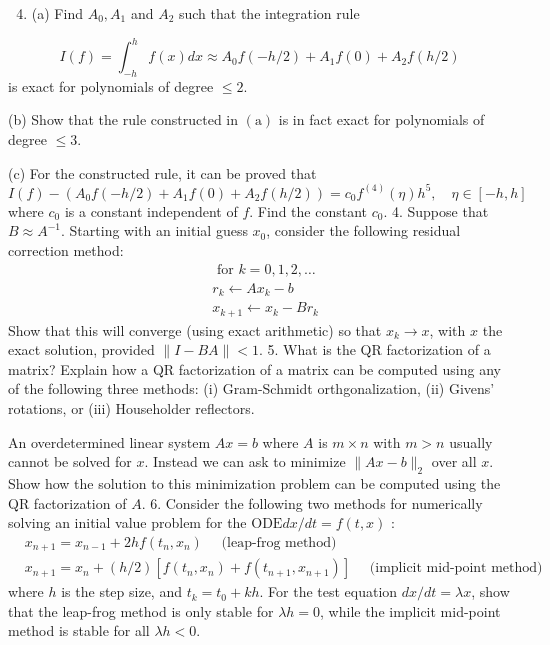 \documentclass[10pt]{article}
\begin{document}
\begin{enumerate}
  \setcounter{enumi}{3}
  \item (a) Find $A_{0}, A_{1}$ and $A_{2}$ such that the integration rule
\end{enumerate}
$$
I(f)=\int_{-h}^{h} f(x) d x \approx A_{0} f(-h / 2)+A_{1} f(0)+A_{2} f(h / 2)
$$
is exact for polynomials of degree $\leq 2$.

(b) Show that the rule constructed in $(\mathrm{a})$ is in fact exact for polynomials of degree $\leq 3$.

(c) For the constructed rule, it can be proved that
$$
I(f)-\left(A_{0} f(-h / 2)+A_{1} f(0)+A_{2} f(h / 2)\right)=c_{0} f^{(4)}(\eta) h^{5}, \quad \eta \in[-h, h]
$$
where $c_{0}$ is a constant independent of $f$. Find the constant $c_{0}$. 4. Suppose that $B \approx A^{-1}$. Starting with an initial guess $x_{0}$, consider the following residual correction method:
$$
\begin{aligned}
&\text { for } k=0,1,2, \ldots \\
&r_{k} \longleftarrow A x_{k}-b \\
&x_{k+1} \leftarrow x_{k}-B r_{k}
\end{aligned}
$$
Show that this will converge (using exact arithmetic) so that $x_{k} \rightarrow x$, with $x$ the exact solution, provided $\|I-B A\|<1$. 5. What is the QR factorization of a matrix? Explain how a QR factorization of a matrix can be computed using any of the following three methods: (i) Gram-Schmidt orthgonalization, (ii) Givens' rotations, or (iii) Householder reflectors.

An overdetermined linear system $A x=b$ where $A$ is $m \times n$ with $m>n$ usually cannot be solved for $x$. Instead we can ask to minimize $\|A x-b\|_{2}$ over all $x$. Show how the solution to this minimization problem can be computed using the QR factorization of $A$. 6. Consider the following two methods for numerically solving an initial value problem for the $\mathrm{ODE} d x / d t=f(t, x)$ :
$$
\begin{aligned}
&x_{n+1}=x_{n-1}+2 h f\left(t_{n}, x_{n}\right) \quad \text { (leap-frog method) } \\
&x_{n+1}=x_{n}+(h / 2)\left[f\left(t_{n}, x_{n}\right)+f\left(t_{n+1}, x_{n+1}\right)\right] \quad \text { (implicit mid-point method) }
\end{aligned}
$$
where $h$ is the step size, and $t_{k}=t_{0}+k h$. For the test equation $d x / d t=\lambda x$, show that the leap-frog method is only stable for $\lambda h=0$, while the implicit mid-point method is stable for all $\lambda h<0$.
\end{document}
